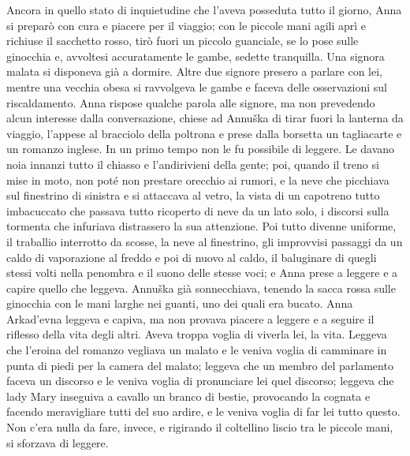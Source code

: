Ancora in quello stato di inquietudine che l'aveva posseduta tutto il giorno, Anna si preparò con cura e piacere per il viaggio; con le piccole mani agili aprì e richiuse il sacchetto rosso, tirò fuori un piccolo guanciale, se lo pose sulle ginocchia e, avvoltesi accuratamente le gambe, sedette tranquilla. Una signora malata si disponeva già a dormire. Altre due signore presero a parlare con lei, mentre una vecchia obesa si ravvolgeva le gambe e faceva delle osservazioni sul riscaldamento. Anna rispose qualche parola alle signore, ma non prevedendo alcun interesse dalla conversazione, chiese ad Annuška di tirar fuori la lanterna da viaggio, l'appese al bracciolo della poltrona e prese dalla borsetta un tagliacarte e un romanzo inglese. In un primo tempo non le fu possibile di leggere. Le davano noia innanzi tutto il chiasso e l'andirivieni della gente; poi, quando il treno si mise in moto, non poté non prestare orecchio ai rumori, e la neve che picchiava sul finestrino di sinistra e si attaccava al vetro, la vista di un capotreno tutto imbacuccato che passava tutto ricoperto di neve da un lato solo, i discorsi sulla tormenta che infuriava distrassero la sua attenzione. Poi tutto divenne uniforme, il traballio interrotto da scosse, la neve al finestrino, gli improvvisi passaggi da un caldo di vaporazione al freddo e poi di nuovo al caldo, il baluginare di quegli stessi volti nella penombra e il suono delle stesse voci; e Anna prese a leggere e a capire quello che leggeva. Annuška già sonnecchiava, tenendo la sacca rossa sulle ginocchia con le mani larghe nei guanti, uno dei quali era bucato. Anna Arkad'evna leggeva e capiva, ma non provava piacere a leggere e a seguire il riflesso della vita degli altri. Aveva troppa voglia di viverla lei, la vita. Leggeva che l'eroina del romanzo vegliava un malato e le veniva voglia di camminare in punta di piedi per la camera del malato; leggeva che un membro del parlamento faceva un discorso e le veniva voglia di pronunciare lei quel discorso; leggeva che lady Mary inseguiva a cavallo un branco di bestie, provocando la cognata e facendo meravigliare tutti del suo ardire, e le veniva voglia di far lei tutto questo. Non c'era nulla da fare, invece, e rigirando il coltellino liscio tra le piccole mani, si sforzava di leggere. 


